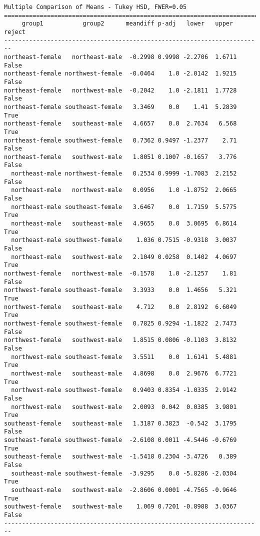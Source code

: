 \documentclass[14pt,a4paper,oneside]{extarticle}
\begin{document}
    \begin{Verbatim}[commandchars=\\\{\}]
          Multiple Comparison of Means - Tukey HSD, FWER=0.05
========================================================================
     group1           group2      meandiff p-adj   lower   upper  reject
------------------------------------------------------------------------
northeast-female   northeast-male  -0.2998 0.9998 -2.2706  1.6711  False
northeast-female northwest-female  -0.0464    1.0 -2.0142  1.9215  False
northeast-female   northwest-male  -0.2042    1.0 -2.1811  1.7728  False
northeast-female southeast-female   3.3469    0.0    1.41  5.2839   True
northeast-female   southeast-male   4.6657    0.0  2.7634   6.568   True
northeast-female southwest-female   0.7362 0.9497 -1.2377    2.71  False
northeast-female   southwest-male   1.8051 0.1007 -0.1657   3.776  False
  northeast-male northwest-female   0.2534 0.9999 -1.7083  2.2152  False
  northeast-male   northwest-male   0.0956    1.0 -1.8752  2.0665  False
  northeast-male southeast-female   3.6467    0.0  1.7159  5.5775   True
  northeast-male   southeast-male   4.9655    0.0  3.0695  6.8614   True
  northeast-male southwest-female    1.036 0.7515 -0.9318  3.0037  False
  northeast-male   southwest-male   2.1049 0.0258  0.1402  4.0697   True
northwest-female   northwest-male  -0.1578    1.0 -2.1257    1.81  False
northwest-female southeast-female   3.3933    0.0  1.4656   5.321   True
northwest-female   southeast-male    4.712    0.0  2.8192  6.6049   True
northwest-female southwest-female   0.7825 0.9294 -1.1822  2.7473  False
northwest-female   southwest-male   1.8515 0.0806 -0.1103  3.8132  False
  northwest-male southeast-female   3.5511    0.0  1.6141  5.4881   True
  northwest-male   southeast-male   4.8698    0.0  2.9676  6.7721   True
  northwest-male southwest-female   0.9403 0.8354 -1.0335  2.9142  False
  northwest-male   southwest-male   2.0093  0.042  0.0385  3.9801   True
southeast-female   southeast-male   1.3187 0.3823  -0.542  3.1795  False
southeast-female southwest-female  -2.6108 0.0011 -4.5446 -0.6769   True
southeast-female   southwest-male  -1.5418 0.2304 -3.4726   0.389  False
  southeast-male southwest-female  -3.9295    0.0 -5.8286 -2.0304   True
  southeast-male   southwest-male  -2.8606 0.0001 -4.7565 -0.9646   True
southwest-female   southwest-male    1.069 0.7201 -0.8988  3.0367  False
------------------------------------------------------------------------
    \end{Verbatim}
\end{document}
